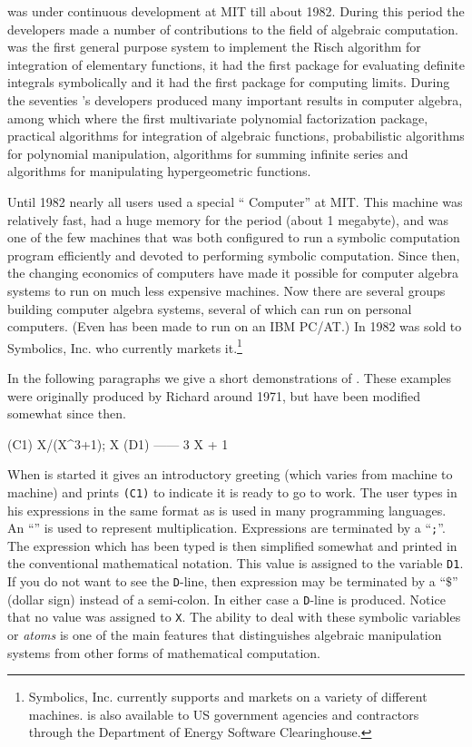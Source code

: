 {\Macsyma} was under continuous development at MIT till about 1982.
During this period the developers made a number of contributions to the
field of algebraic computation.  {\Macsyma} was the first general purpose
system to implement the Risch algorithm for integration of elementary
functions, it had the first package for evaluating definite integrals
symbolically and it had the first package for computing limits.  During
the seventies {\Macsyma}'s developers produced many important results in
computer algebra, among which where the first multivariate polynomial
factorization package, practical algorithms for integration of algebraic
functions, probabilistic algorithms for polynomial manipulation,
algorithms for summing infinite series and algorithms for manipulating
hypergeometric functions.

Until 1982 nearly all {\Macsyma} users used a special ``{\Macsyma} Computer''
at MIT.  This machine was relatively fast, had a huge memory for the period
(about 1 megabyte), and was one of the few machines that was both
configured to run a symbolic computation program efficiently and devoted to
performing symbolic computation.  Since then, the changing economics of
computers have made it possible for computer algebra systems to run on much
less expensive machines.  Now there are several groups building computer
algebra systems, several of which can run on personal computers.  (Even
{\Macsyma} has been made to run on an IBM PC/AT.) In 1982 {\Macsyma} was sold
to Symbolics, Inc.  who currently markets it.\footnote{Symbolics, Inc.
currently supports and markets {\Macsyma} on a variety of different machines.
{\Macsyma} is also available to US government agencies and contractors through
the Department of Energy Software Clearinghouse.}

In the following paragraphs we give a short demonstrations of {\Macsyma}.
These examples were originally produced by Richard {\Fateman} around 1971, but
have been modified somewhat since then.
 
\begin{code}
(C1) X/(X^3+1);
                                      X
(D1)                                ------
                                     3
                                    X  + 1
\end{code}
When {\Macsyma} is started it gives an introductory greeting (which varies
from machine to machine) and prints {\tt (C1)} to indicate
it is ready to go to work.  The user types in his expressions in the
same format as is used in many programming languages.  An ``{\tt *}''
is used to represent multiplication.  Expressions are terminated by
a ``{\tt ;}''.  The expression which has been typed is then
simplified somewhat and printed in the conventional mathematical notation.
This value is assigned to the variable {\tt D1}.  If you do not want to
see the {\tt D}-line, then expression may be terminated by a ``$\$ $'' (dollar
sign) instead of a semi-colon.  In either case a {\tt D}-line is
produced.  Notice that no value was
assigned to {\tt X}.  The ability to deal with these symbolic variables or {\em
atoms} is one of the main features that distinguishes algebraic manipulation
systems from other forms of mathematical computation.

